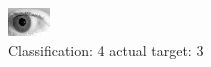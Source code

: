 \begin{figure}[h!]
\begin{center}
\includegraphics[width=0.60\columnwidth]{figures/ID255_class_4_target_3.png}
\end{center}
\caption{ Classification: 4 actual target: 3}
\label{fig:ID255_class_4_target_3}
\end{figure}
